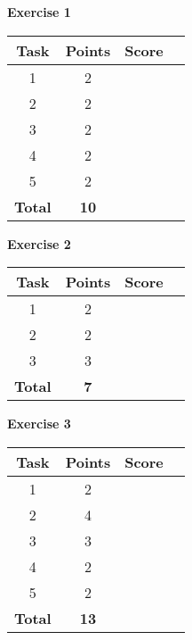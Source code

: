 \documentclass [11pt, a4wide, twoside]{article}
\begin{document}
\begin{minipage}[t]{120pt}
\textbf{Exercise 1}
\vspace{5pt}\\
\begin{tabular}{|c|c|c|c|}
\hline
Task & Points & Score \\\hline
1 & 2 & \\\hline
2 & 2 & \\\hline
3 & 2 & \\\hline
4 & 2 & \\\hline
5 & 2 & \\\hline
\textbf{Total} & \textbf{10} &\\\hline\hline
\end{tabular}
\end{minipage}
\begin{minipage}[t]{120pt}




\textbf{Exercise 2}
\vspace{5pt}\\
\begin{tabular}{|c|c|c|c|}
\hline
Task & Points & Score \\\hline
1 & 2 & \\\hline
2 & 2 & \\\hline
3 & 3 & \\\hline
\textbf{Total} & \textbf{7} &\\\hline\hline
\end{tabular}
\end{minipage}
\begin{minipage}[t]{120pt}


\textbf{Exercise 3}
\vspace{5pt}\\
\begin{tabular}{|c|c|c|c|}
\hline
Task & Points & Score \\\hline
1 & 2 & \\\hline
2 & 4 & \\\hline
3 & 3 & \\\hline
4 & 2 & \\\hline
5 & 2 & \\\hline
\textbf{Total} & \textbf{13} &\\\hline\hline
\end{tabular}
\end{minipage}
\end{document}

